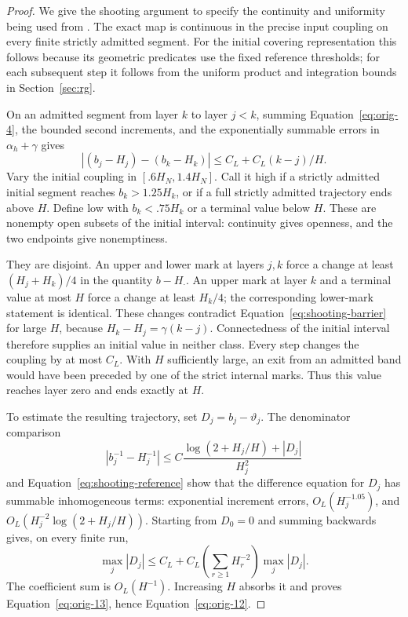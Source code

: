 \begin{proof}
We give the shooting argument to specify the continuity and uniformity
being used from . The exact map is continuous in
the precise input coupling on every finite strictly admitted segment.
For the initial covering representation this follows because its
geometric predicates use the fixed reference thresholds; for each
subsequent step it follows from the uniform product and integration
bounds in Section~\ref{sec:rg}.

On an admitted segment from layer $k$ to layer $j<k$, summing
Equation~\eqref{eq:orig-4}, the bounded second increments, and the
exponentially summable errors in
$\alpha_h+\gamma$ gives
\begin{equation}
 |(b_j-H_j)-(b_k-H_k)|
   \le C_L+C_L(k-j)/H.
 \label{eq:shooting-barrier}
\end{equation}
Vary the initial coupling in $[.6H_N,1.4H_N]$. Call it high if a
strictly admitted initial segment reaches $b_k>1.25H_k$, or if a full
strictly admitted trajectory ends above $H$. Define low with
$b_k<.75H_k$ or a terminal value below $H$. These are nonempty open
subsets of the initial interval: continuity gives openness, and the
two endpoints give nonemptiness.

They are disjoint. An upper and lower mark at layers $j,k$ force a
change at least $(H_j+H_k)/4$ in the quantity $b-H_{\cdot}$. An upper
mark at layer $k$ and a terminal value at most $H$ force a change at
least $H_k/4$; the corresponding lower-mark statement is identical.
These changes contradict Equation~\eqref{eq:shooting-barrier} for
large $H$, because $H_k-H_j=\gamma(k-j)$. Connectedness of the initial
interval therefore supplies an initial value in neither class.
Every step changes the coupling by at most $C_L$. With $H$ sufficiently
large, an exit from an admitted band would have been preceded by one
of the strict internal marks. Thus this value reaches layer zero and
ends exactly at $H$.

To estimate the resulting trajectory, set $D_j=b_j-\vartheta_j$.
The denominator comparison
\[
 |b_j^{-1}-H_j^{-1}|
 \le C\frac{\log(2+H_j/H)+|D_j|}{H_j^2}
\]
and Equation~\eqref{eq:shooting-reference} show that the difference
equation for $D_j$ has summable inhomogeneous terms: exponential
increment errors, $O_L(H_j^{-1.05})$, and
$O_L(H_j^{-2}\log(2+H_j/H))$. Starting from $D_0=0$ and summing
backwards gives, on every finite run,
\[
 \max_j|D_j|
 \le C_L+C_L\left(\sum_{r\ge1}H_r^{-2}\right)\max_j|D_j|.
\]
The coefficient sum is $O_L(H^{-1})$. Increasing $H$ absorbs it and
proves Equation~\eqref{eq:orig-13}, hence
Equation~\eqref{eq:orig-12}.


\end{proof}
